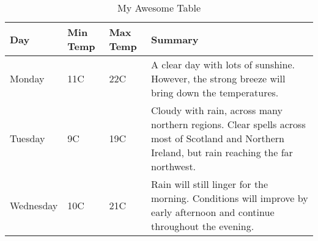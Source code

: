 \begin{table}[h]
\centering
\caption{My Awesome Table}
\label{tab:my_awesome_table}
\begin{tabular}{ l l l p{2in} }
\hline
Day & Min Temp & Max Temp & Summary \\ \hline
Monday & 11C & 22C & A clear day with lots of sunshine.
However, the strong breeze will bring down the temperatures. \\ \hline
Tuesday & 9C & 19C & Cloudy with rain, across many northern regions. Clear
spells
across most of Scotland and Northern Ireland,
but rain reaching the far northwest. \\ \hline
Wednesday & 10C & 21C & Rain will still linger for the morning.
Conditions will improve by early afternoon and continue
throughout the evening. \\
\hline
\end{tabular}
\end{table}
